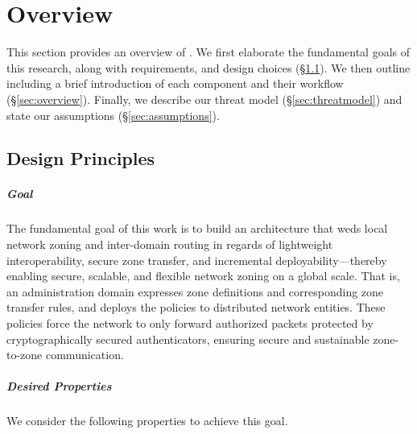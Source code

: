 \chapter{Overview}
\label{overview}

This section provides an overview of \name. We first elaborate the fundamental goals
of this research, along with requirements, and design choices (\S\ref{sec:design}).
We then outline \name including a brief introduction of each component and their
workflow (\S\ref{sec:overview}). Finally, we describe our threat model
(\S\ref{sec:threatmodel}) and state our assumptions (\S\ref{sec:assumptions}).

\section{Design Principles}
\label{sec:design}

\paragraph{Goal}
The fundamental goal of this work is to build an architecture that weds local
network zoning and inter-domain routing in regards of lightweight interoperability,
secure zone transfer, and incremental deployability---thereby enabling secure,
scalable, and flexible network zoning on a global scale. That is, an administration
domain expresses zone definitions and corresponding zone transfer rules, and
deploys the policies to distributed network entities. These policies force the
network to only forward authorized packets protected by cryptographically
secured authenticators, ensuring secure and sustainable zone-to-zone communication.

\paragraph{Desired Properties}
We consider the following properties to achieve this goal.

